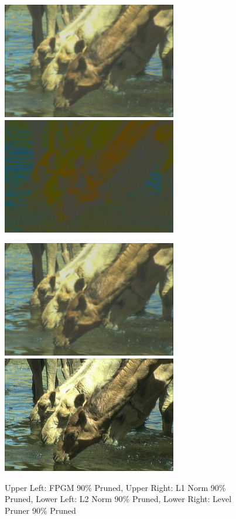 \documentclass{article}
\begin{document}
\begin{figure}
    \centerline{\includegraphics[width=3in]{../final/figures/camel_fpgm_90.jpg}\includegraphics[width=3in]{../final/figures/camel_l1norm_90.jpg}}
    \centerline{\includegraphics[width=3in]{../final/figures/camel_l2norm_90.jpg}\includegraphics[width=3in]{../final/figures/camel_level_90.jpg}}
    \caption{Upper Left: FPGM 90\% Pruned, Upper Right: L1 Norm 90\% Pruned, Lower Left: L2 Norm 90\% Pruned, Lower Right: Level Pruner 90\% Pruned}
    \label{fig:pruned}
\end{figure}
\end{document}

